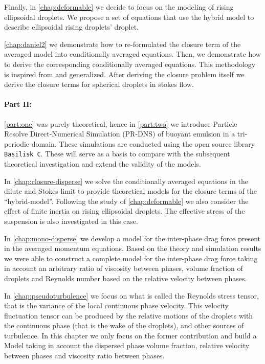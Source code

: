 Finally, in \ref{chap:deformable} we decide to focus on the modeling of rising ellipsoidal droplets. 
We propose a set of equations that use the hybrid model to describe ellipsoidal rising droplets' droplet. 


\ref{chap:daniel2} we demonstrate how to re-formulated the closure term of the averaged model into conditionally averaged equations. 
Then, we demonstrate how to derive the corresponding conditionally averaged equations. 
This methodology is inspired from \citet{hinch1977averaged} and generalized.
After deriving the closure problem itself we derive the closure terms for spherical droplets in stokes flow.  




\paragraph*{Part II: } 
\ref{part:one} was purely theoretical, hence in \ref{part:two} we introduce Particle Resolve Direct-Numerical Simulation (PR-DNS) of buoyant emulsion in a tri-periodic domain. 
These simulations are conducted using the open source library \texttt{Basilisk C}.
These will serve as a basis to compare with the subsequent theoretical investigation and extend the validity of the models.  

In \ref{chap:closure-disperse} we solve the conditionally averaged equations in the dilute and Stokes limit to provide theoretical models for the closure terms of the ``hybrid-model''. 
Following the study of \ref{chap:deformable} we also consider the effect of finite inertia on rising ellipsoidal droplets.
The effective stress of the suspension is also investigated in this case.  


In \ref{chap:mono-disperse} we develop a model for the inter-phase drag force present in the averaged momentum equations. 
Based on the theory and simulation results we were able to construct a complete model for the inter-phase drag force taking in account an arbitrary ratio of viscosity between phases, volume fraction of droplets and Reynolds number based on the relative velocity between phases. 

In \ref{chap:pseudoturbulence} we focus on what is called the Reynolds stress tensor, that is the variance of the local continuous phase velocity. 
This velocity fluctuation tensor can be produced by the relative motions of the droplets with the continuous phase (that is the wake of the droplets), and other sources of turbulence. 
In this chapter we only focus on the former contribution and build a Model taking in account the dispersed phase volume fraction, relative velocity between phases and viscosity ratio between phases. 



